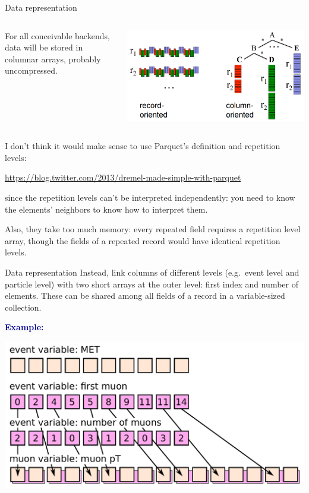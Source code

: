 \documentclass{beamer}
\begin{document}
\begin{frame}{Data representation}
\vspace{0.5 cm}
\begin{columns}
For all conceivable backends, data will be stored in columnar arrays, probably uncompressed.

\includegraphics[width=\linewidth]{columnar.png}
\end{columns}

\vspace{0.5 cm}
I don't think it would make sense to use Parquet's definition and repetition levels:
\begin{center}
\textcolor{blue}{\scriptsize\url{https://blog.twitter.com/2013/dremel-made-simple-with-parquet}}
\end{center}
since the repetition levels can't be interpreted independently: you need to know the elements' neighbors to know how to interpret them.

\vspace{0.2 cm}
Also, they take too much memory: every repeated field requires a repetition level array, though the fields of a repeated record would have identical repetition levels.
\end{frame}

\begin{frame}{Data representation}
\vspace{0.5 cm}
Instead, link columns of different levels (e.g.\ event level and particle level) with two short arrays at the outer level: first index and number of elements. These can be shared among all fields of a record in a variable-sized collection.

\vspace{0.25 cm}
\textcolor{darkblue}{\bf Example:}

\includegraphics[width=\linewidth]{hierarchical_arrays.pdf}
\end{frame}
\end{document}
